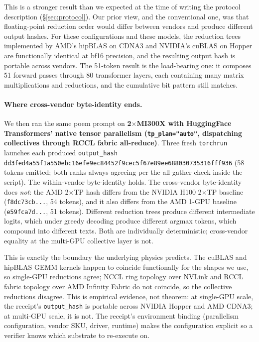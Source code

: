 \documentclass[10pt]{article}
\begin{document}
This is a stronger result than we expected at the time of writing the protocol description (\S\ref{sec:protocol}). Our prior view, and the conventional one, was that floating-point reduction order would differ between vendors and produce different output hashes. For these configurations and these models, the reduction trees implemented by AMD's hipBLAS on CDNA3 and NVIDIA's cuBLAS on Hopper are functionally identical at bf16 precision, and the resulting output hash is portable across vendors. The 51-token result is the load-bearing one: it composes 51 forward passes through 80 transformer layers, each containing many matrix multiplications and reductions, and the cumulative bit pattern still matches.

\paragraph{Where cross-vendor byte-identity ends.} We then ran the same poem prompt on \textbf{2$\times$MI300X with HuggingFace Transformers' native tensor parallelism (\texttt{tp\_plan="auto"}, dispatching collectives through RCCL fabric all-reduce)}. Three fresh \texttt{torchrun} launches each produced \texttt{output\_hash dd3fed4a55f1a550ebc16efe9ec84452f9cec5f67e89ee688030735316fff936} (58 tokens emitted; both ranks always agreeing per the all-gather check inside the script). The within-vendor byte-identity holds. The cross-vendor byte-identity does \emph{not}: the AMD 2$\times$TP hash differs from the NVIDIA H100 2$\times$TP baseline (\texttt{f8dc73cb...}, 54 tokens), and it also differs from the AMD 1-GPU baseline (\texttt{e59fca7d...}, 51 tokens). Different reduction trees produce different intermediate logits, which under greedy decoding produce different argmax tokens, which compound into different texts. Both are individually deterministic; cross-vendor equality at the multi-GPU collective layer is not.

This is exactly the boundary the underlying physics predicts. The cuBLAS and hipBLAS GEMM kernels happen to coincide functionally for the shapes we use, so single-GPU reductions agree; NCCL ring topology over NVLink and RCCL fabric topology over AMD Infinity Fabric do not coincide, so the collective reductions disagree. This is empirical evidence, not theorem: at single-GPU scale, the receipt's \texttt{output\_hash} is portable across NVIDIA Hopper and AMD CDNA3; at multi-GPU scale, it is not. The receipt's environment binding (parallelism configuration, vendor SKU, driver, runtime) makes the configuration explicit so a verifier knows which substrate to re-execute on.
\end{document}
